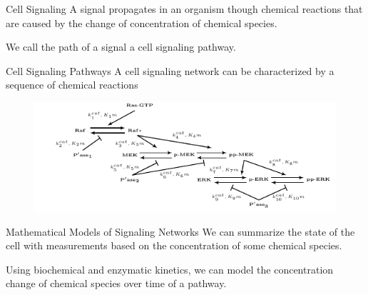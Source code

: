 \documentclass{beamer}
\begin{document}
\begin{frame}{Cell Signaling}
A signal propagates in an organism though chemical reactions that are
caused by the change of concentration of chemical species.

\pause
We call the path of a signal a \alert{cell signaling pathway}.
\end{frame}


\begin{frame}{Cell Signaling Pathways}
A cell signaling network can be characterized by a sequence of chemical 
reactions 
\begin{figure}
    \includegraphics[scale=1.2, trim={.5cm 0 0 0}, clip]{introduction/csp_example.pdf}
\end{figure}
\end{frame}

\begin{frame}{Mathematical Models of Signaling Networks}
We can summarize the state of the cell with measurements based on the 
concentration of some chemical species.
\pause

Using biochemical and enzymatic kinetics, \alert{we can model the 
concentration change of chemical species over time} of a pathway.
\end{frame}




\end{document}
